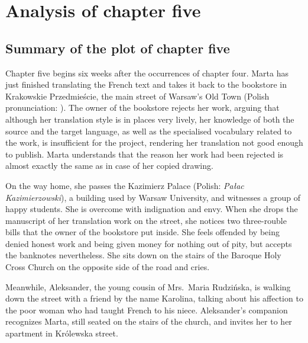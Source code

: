 \section{Analysis of chapter five}

\subsection{Summary of the plot of chapter five}

Chapter five begins six weeks after the occurrences of chapter four.
Marta has just finished translating the French text and takes it back to the bookstore in Krakowskie Przedmieście, the main street of Warsaw's Old Town (Polish pronunciation: ).
The owner of the bookstore rejects her work, arguing that although her translation style is in places very lively, her knowledge of both the source and the target language, as well as the specialised vocabulary related to the work, is insufficient for the project, rendering her translation not good enough to publish.
Marta understands that the reason her work had been rejected is almost exactly the same as in case of her copied drawing.

On the way home, she passes the Kazimierz Palace (Polish: \textit{Pałac Kazimierzowski}), a building used by Warsaw University, and witnesses a group of happy students.
She is overcome with indignation and envy.
When she drops the manuscript of her translation work on the street, she notices two three-rouble bills that the owner of the bookstore put inside.
She feels offended by being denied honest work and being given money for nothing out of pity, but accepts the banknotes nevertheless.
She sits down on the stairs of the Baroque Holy Cross Church on the opposite side of the road and cries.

Meanwhile, Aleksander, the young cousin of Mrs.\ Maria Rudzińska, is walking down the street with a friend by the name Karolina, talking about his affection to the poor woman who had taught French to his niece.
Aleksander's companion recognizes Marta, still seated on the stairs of the church, and invites her to her apartment in Królewska street.
